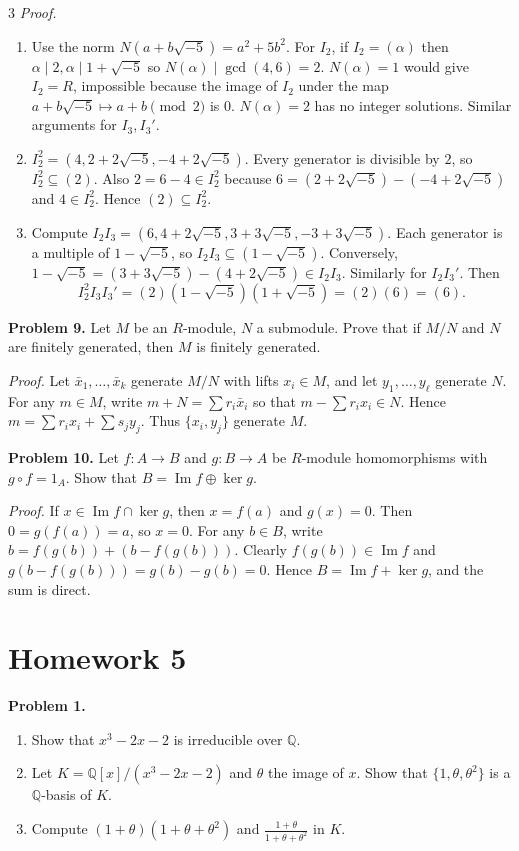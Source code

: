 \documentclass[10pt,landscape]{article}
\begin{document}
\begin{multicols}{3}
\textit{Proof.}
\begin{enumerate}
\item Use the norm \(N(a+b\sqrt{-5})=a^2+5b^2\). For \(I_2\), if \(I_2=(\alpha)\) then \(\alpha\mid2,\alpha\mid1+\sqrt{-5}\) so \(N(\alpha)\mid\gcd(4,6)=2\). \(N(\alpha)=1\) would give \(I_2=R\), impossible because the image of \(I_2\) under the map \(a+b\sqrt{-5}\mapsto a+b\pmod2\) is \(0\). \(N(\alpha)=2\) has no integer solutions. Similar arguments for \(I_3,I_3'\).
\item \(I_2^2=(4,2+2\sqrt{-5},-4+2\sqrt{-5})\). Every generator is divisible by \(2\), so \(I_2^2\subseteq(2)\). Also \(2=6-4\in I_2^2\) because \(6=(2+2\sqrt{-5})-(-4+2\sqrt{-5})\) and \(4\in I_2^2\). Hence \((2)\subseteq I_2^2\).
\item Compute \(I_2I_3=(6,4+2\sqrt{-5},3+3\sqrt{-5},-3+3\sqrt{-5})\). Each generator is a multiple of \(1-\sqrt{-5}\), so \(I_2I_3\subseteq(1-\sqrt{-5})\). Conversely, \(1-\sqrt{-5}=(3+3\sqrt{-5})-(4+2\sqrt{-5})\in I_2I_3\). Similarly for \(I_2I_3'\). Then
\[
I_2^2I_3I_3'=(2)(1-\sqrt{-5})(1+\sqrt{-5})=(2)(6)=(6).
\]
\end{enumerate}

\noindent\textbf{Problem 9.} Let \(M\) be an \(R\)-module, \(N\) a submodule. Prove that if \(M/N\) and \(N\) are finitely generated, then \(M\) is finitely generated.

\textit{Proof.} Let \(\bar{x}_1,\dots,\bar{x}_k\) generate \(M/N\) with lifts \(x_i\in M\), and let \(y_1,\dots,y_\ell\) generate \(N\). For any \(m\in M\), write \(m+N=\sum r_i\bar{x}_i\) so that \(m-\sum r_ix_i\in N\). Hence \(m=\sum r_ix_i+\sum s_jy_j\). Thus \(\{x_i,y_j\}\) generate \(M\). 

\noindent\textbf{Problem 10.} Let \(f:A\to B\) and \(g:B\to A\) be \(R\)-module homomorphisms with \(g\circ f=1_A\). Show that \(B=\operatorname{Im}f\oplus\ker g\).

\textit{Proof.} If \(x\in\operatorname{Im}f\cap\ker g\), then \(x=f(a)\) and \(g(x)=0\). Then \(0=g(f(a))=a\), so \(x=0\). For any \(b\in B\), write \(b=f(g(b))+(b-f(g(b)))\). Clearly \(f(g(b))\in\operatorname{Im}f\) and \(g(b-f(g(b)))=g(b)-g(b)=0\). Hence \(B=\operatorname{Im}f+\ker g\), and the sum is direct. 

\section*{Homework 5}

\noindent\textbf{Problem 1.}
\begin{enumerate}
\item Show that \(x^3-2x-2\) is irreducible over \(\mathbb{Q}\).
\item Let \(K=\mathbb{Q}[x]/(x^3-2x-2)\) and \(\theta\) the image of \(x\). Show that \(\{1,\theta,\theta^2\}\) is a \(\mathbb{Q}\)-basis of \(K\).
\item Compute \((1+\theta)(1+\theta+\theta^2)\) and \(\frac{1+\theta}{1+\theta+\theta^2}\) in \(K\).
\end{enumerate}


\end{multicols}
\end{document}
